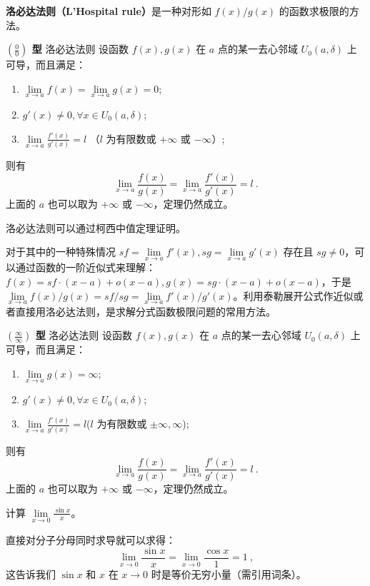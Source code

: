 

\textbf{洛必达法则（L'Hospital rule）}是一种对形如 $f(x)/g(x)$ 的函数求极限的方法。

\begin{theorem}{\textbf{$\left(\frac{0}{0}\right)$ 型} 洛必达法则}
设函数 $f(x),g(x)$ 在 $a$ 点的某一去心邻域 $U_0(a,\delta)$ 上可导，而且满足：
\begin{enumerate}
\item $\lim\limits_{x\rightarrow a} f(x)=\lim\limits_{x\rightarrow a}g(x)=0$;
\item $g'(x)\neq 0,\forall x\in U_0(a,\delta)$;
\item $\displaystyle\lim\limits_{x\rightarrow a} \frac{f'(x)}{g'(x)}=l$ （$l$ 为有限数或 $+\infty$ 或 $-\infty$）;
\end{enumerate}
则有
\begin{equation}
\lim\limits_{x\rightarrow a}\frac{f(x)}{g(x)}=\lim\limits_{x\rightarrow a}\frac{f'(x)}{g'(x)}=l~.
\end{equation}
上面的 $a$ 也可以取为 $+\infty$ 或 $-\infty$，定理仍然成立。
\end{theorem}
洛必达法则可以通过柯西中值定理证明。

对于其中的一种特殊情况 $sf=\lim\limits_{x\rightarrow a}f'(x),sg=\lim\limits_{x\rightarrow a}g'(x)$ 存在且 $sg\neq 0$，可以通过函数的一阶近似式来理解：$f(x)=sf\cdot (x-a)+o(x-a),g(x)=sg\cdot (x-a)+o(x-a)$，于是 $\lim\limits_{x\rightarrow a}f(x)/g(x)=sf/sg=\lim\limits_{x\rightarrow a}f'(x)/g'(x)$。利用泰勒展开公式作近似或者直接用洛必达法则，是求解分式函数极限问题的常用方法。

\begin{theorem}{\textbf{$\left(\frac{\infty}{\infty}\right)$ 型} 洛必达法则}
设函数 $f(x),g(x)$ 在 $a$ 点的某一去心邻域 $U_0(a,\delta)$ 上可导，而且满足：
\begin{enumerate}
\item $\lim\limits_{x\rightarrow a} g(x)=\infty$;
\item $g'(x)\neq 0,\forall x\in U_0(a,\delta)$;
\item $\lim\limits_{x\rightarrow a} \frac{f'(x)}{g'(x)}=l$($l$ 为有限数或 $\pm\infty,\infty$);
\end{enumerate}
则有
\begin{equation}
\lim\limits_{x\rightarrow a}\frac{f(x)}{g(x)}=\lim\limits_{x\rightarrow a}\frac{f'(x)}{g'(x)}=l~.
\end{equation}
上面的 $a$ 也可以取为 $+\infty$ 或 $-\infty$，定理仍然成立。
\end{theorem}
\begin{exercise}{}
计算 $\lim\limits_{x\rightarrow 0}\frac{\sin x}{x}$。
\end{exercise}
直接对分子分母同时求导就可以求得：
\begin{equation}
    \lim\limits_{x\rightarrow 0}\frac{\sin x}{x}=\lim\limits_{x\rightarrow 0}\frac{\cos x}{1}=1~,
\end{equation}
这告诉我们 $\sin x$ 和 $x$ 在 $x\rightarrow 0$ 时是等价无穷小量（需引用词条）。

